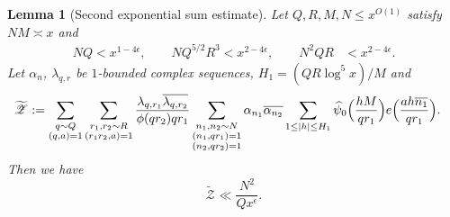 \documentclass[10pt]{amsart}
\theoremstyle{plain}
\newtheorem{lmm}[thrm]{Lemma}
\numberwithin{equation}{section}
\renewcommand{\hat}[1]{\widehat #1}
\begin{document}
%
%
%
%
%
%
%
%
\begin{lmm}[Second exponential sum estimate]\label{lmm:Zhang2}
Let $Q,R,M,N\le x^{O(1)}$ satisfy $NM\asymp x$ and
\begin{align*}
N Q < x^{1-4\epsilon},\qquad
N Q^{5/2}R^3< x^{2-4\epsilon}, \qquad
N^2 Q R &<x^{2-4\epsilon}.
\end{align*}
Let $\alpha_n$, $\lambda_{q,r}$ be $1$-bounded complex sequences, $H_1=(QR\log^5{x})/M$ and 
\begin{align*}
\widetilde{\mathscr{Z}^{}}&:=\sum_{\substack{q\sim Q \\ (q,a)=1}}\sum_{\substack{r_1,r_2\sim R\\ (r_1 r_2,a)=1}}\frac{\lambda_{q,r_1}\overline{\lambda_{q,r_2}}}{\phi(q r_2)q r_1}\sum_{\substack{n_1,n_2\sim N\\ (n_1,q r_1)=1\\(n_2,q r_2)=1}}\alpha_{n_1}\overline{\alpha_{n_2}}\sum_{1\le |h|\le H_1}\hat{\psi}_0\Bigl(\frac{h M}{q r_1}\Bigr)e\Bigl( \frac{a h \overline{ n_1}}{q r_1}\Bigr).
\end{align*}
Then we have
\[
\widetilde{\mathscr{Z}^{}}\ll \frac{N^2}{Q x^\epsilon}.
\]
\end{lmm}
%
%
%
%
\end{document}
